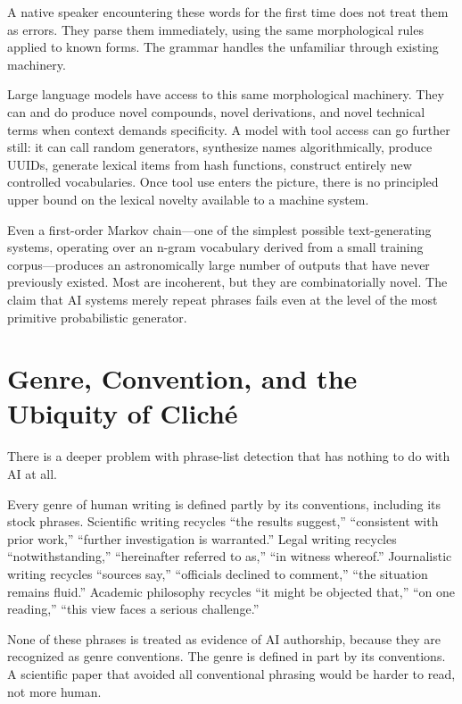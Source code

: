 \documentclass[12pt]{article}
\begin{document}
A native speaker encountering these words for the first time does not treat them as errors. They parse them immediately, using the same morphological rules applied to known forms. The grammar handles the unfamiliar through existing machinery.

Large language models have access to this same morphological machinery. They can and do produce novel compounds, novel derivations, and novel technical terms when context demands specificity. A model with tool access can go further still: it can call random generators, synthesize names algorithmically, produce UUIDs, generate lexical items from hash functions, construct entirely new controlled vocabularies. Once tool use enters the picture, there is no principled upper bound on the lexical novelty available to a machine system.

Even a first-order Markov chain---one of the simplest possible text-generating systems, operating over an n-gram vocabulary derived from a small training corpus---produces an astronomically large number of outputs that have never previously existed. Most are incoherent, but they are combinatorially novel. The claim that AI systems merely repeat phrases fails even at the level of the most primitive probabilistic generator.

\section{Genre, Convention, and the Ubiquity of Clich\'e}

There is a deeper problem with phrase-list detection that has nothing to do with AI at all.

Every genre of human writing is defined partly by its conventions, including its stock phrases. Scientific writing recycles ``the results suggest,'' ``consistent with prior work,'' ``further investigation is warranted.'' Legal writing recycles ``notwithstanding,'' ``hereinafter referred to as,'' ``in witness whereof.'' Journalistic writing recycles ``sources say,'' ``officials declined to comment,'' ``the situation remains fluid.'' Academic philosophy recycles ``it might be objected that,'' ``on one reading,'' ``this view faces a serious challenge.''

None of these phrases is treated as evidence of AI authorship, because they are recognized as genre conventions. The genre is defined in part by its conventions. A scientific paper that avoided all conventional phrasing would be harder to read, not more human.
\end{document}
